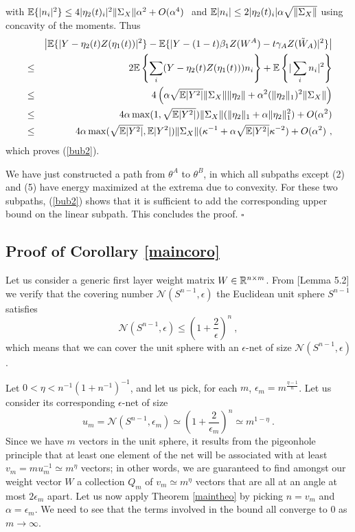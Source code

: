 with ${\mathbb{E}}\{ |n_i |^2 \} \leq 4 |\eta_2(t)_i|^2 \| \Sigma_X \| \alpha^2 + O(\alpha^4)~$ and ${\mathbb{E}} |n_i| \leq 2 |\eta_2(t)_i| \alpha \sqrt{\| \Sigma_X\|}$ using concavity of the moments.
Thus 
\begin{eqnarray*}
&& \left | {\mathbb{E}} \{ | Y - \eta_2(t) Z(\eta_1(t) ) |^2 \}  - {\mathbb{E}} \{ | Y - (1-t) \beta_1 Z(W^A) - t \gamma_A Z(\tilde{W}_A) |^2 \} \right| \\
 &\leq& 2{\mathbb{E}} \left\{  \sum_i (Y - \eta_2(t) Z(\eta_1(t) )) n_i  \right\} + {\mathbb{E}} \left\{ | \sum_i n_i |^2 \right\} \\
 &\leq & 4\left(\alpha \sqrt{{\mathbb{E}}|Y^2|} \| \Sigma_X\|  \| \eta_2 \| + \alpha^2 (\| \eta_2 \|_1)^2  \| \Sigma_X \| \right) \\
 &\leq & 4 \alpha \max(1, \sqrt{{\mathbb{E}}|Y^2|}) \| \Sigma_X \| ( \| \eta_2 \|_1 + \alpha \| \eta_2 \|_1^2) + O(\alpha^2) \\
 & \leq & 4 \alpha \max(\sqrt{{\mathbb{E}}|Y^2|}, {{\mathbb{E}}|Y^2|}) \| \Sigma_X \|  ( \kappa^{-1} + \alpha \sqrt{{\mathbb{E}}|Y^2|} \kappa^{-2}) + O(\alpha^2)~,
\end{eqnarray*}
 which proves (\ref{bub2}). 
 
We have just constructed a path from $\theta^A$ to $\theta^B$, in which all subpaths except (2) and (5) have energy maximized at the extrema due to convexity. For these two subpaths, (\ref{bub2}) shows that it is sufficient to add the corresponding upper bound on the linear subpath. This concludes the proof. $\square$
 




\subsection{Proof of Corollary \ref{maincoro}}

Let us consider a generic first layer weight matrix $W \in {\mathbb{R}}^{n \times m}$. 
From \cite{vershynin} [Lemma 5.2] we verify that the covering number $\mathcal{N}(S^{n-1}, \epsilon)$ the Euclidean unit sphere $S^{n-1}$ 
satisfies 
$$\mathcal{N}(S^{n-1}, \epsilon) \leq \left( 1 + \frac{2}{\epsilon} \right)^n~,$$
which means that we can cover the unit sphere with an $\epsilon$-net of size $\mathcal{N}(S^{n-1}, \epsilon) $. 

Let $0< \eta < n^{-1} ( 1 + n^{-1})^{-1}$, and let us pick, for each $m$, $\epsilon_m = m^{\frac{\eta-1}{n} }$. 
Let us consider its corresponding $\epsilon$-net of size 
$$u_m = \mathcal{N}(S^{n-1}, \epsilon_m) \simeq \left( 1 + \frac{2}{\epsilon_m} \right)^n \simeq m^{1-\eta} ~.$$
Since we have $m$ vectors in the unit sphere, it results from the pigeonhole principle that at least one 
element of the net will be associated with at least $v_m = m u_m^{-1} \simeq m^{\eta}$ vectors; in other words, 
we are guaranteed to find amongst our weight vector $W$ a collection $Q_m$ of $v_m \simeq m^\eta$ vectors that are all 
at an angle at most $2\epsilon_m$ apart. 
Let us now apply Theorem \ref{maintheo} by picking $n=v_m$ and $\alpha = \epsilon_m$. 
We need to see that the terms involved in the bound all converge to $0$ as $m \to \infty$. 

